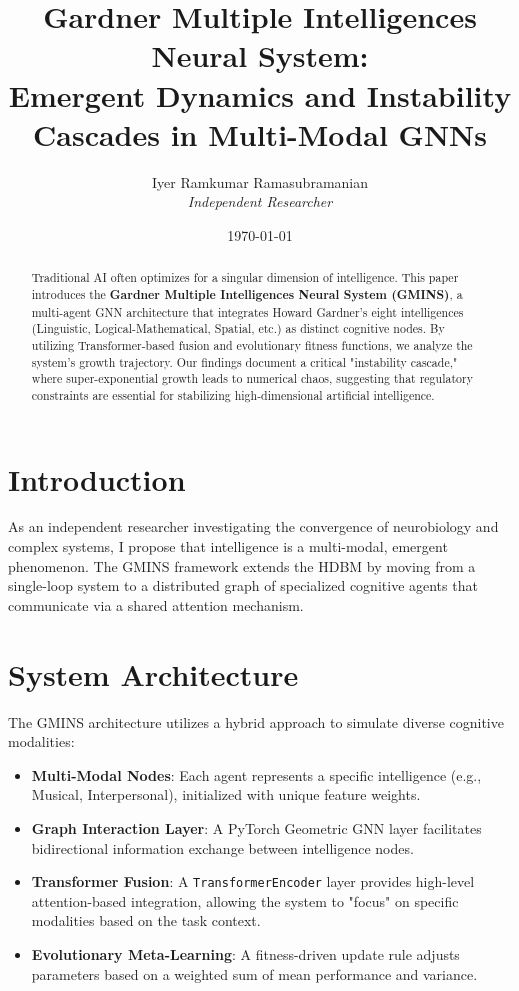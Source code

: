 \documentclass[12pt]{article}
\title{\textbf{Gardner Multiple Intelligences Neural System: \\ Emergent Dynamics and Instability Cascades in Multi-Modal GNNs}}
\author{Iyer Ramkumar Ramasubramanian \\ \textit{Independent Researcher}}
\date{\today}
\begin{document}
\maketitle

\begin{abstract}
Traditional AI often optimizes for a singular dimension of intelligence. This paper introduces the \textbf{Gardner Multiple Intelligences Neural System (GMINS)}, a multi-agent GNN architecture that integrates Howard Gardner’s eight intelligences (Linguistic, Logical-Mathematical, Spatial, etc.) as distinct cognitive nodes. By utilizing Transformer-based fusion and evolutionary fitness functions, we analyze the system's growth trajectory. Our findings document a critical "instability cascade," where super-exponential growth leads to numerical chaos, suggesting that regulatory constraints are essential for stabilizing high-dimensional artificial intelligence.
\end{abstract}

\section{Introduction}
As an independent researcher investigating the convergence of neurobiology and complex systems, I propose that intelligence is a multi-modal, emergent phenomenon. The GMINS framework extends the HDBM by moving from a single-loop system to a distributed graph of specialized cognitive agents that communicate via a shared attention mechanism.

\section{System Architecture}

The GMINS architecture utilizes a hybrid approach to simulate diverse cognitive modalities:

\begin{itemize}
\item \textbf{Multi-Modal Nodes}: Each agent represents a specific intelligence (e.g., Musical, Interpersonal), initialized with unique feature weights.
\item \textbf{Graph Interaction Layer}: A PyTorch Geometric GNN layer facilitates bidirectional information exchange between intelligence nodes.
\item \textbf{Transformer Fusion}: A \texttt{TransformerEncoder} layer provides high-level attention-based integration, allowing the system to "focus" on specific modalities based on the task context.
\item \textbf{Evolutionary Meta-Learning}: A fitness-driven update rule adjusts parameters based on a weighted sum of mean performance and variance.
\end{itemize}
\end{document}
